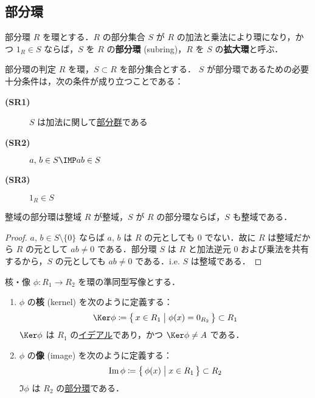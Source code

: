 \documentclass[geometry_main]{subfiles}
\begin{document}
\subsection{部分環}

\begin{mydef}[label=def:subring]{部分環}
	$R$ を環とする．$R$ の部分集合 $S$ が $R$ の加法と乗法により環になり，かつ $1_R\in S$ ならば，$S$ を $R$ の\textbf{部分環} (subring)，$R$ を $S$ の\textbf{拡大環}と呼ぶ．
\end{mydef}

\begin{myprop}[label=prop:subring]{部分環の判定}
	$R$ を環，$S \subset R$ を部分集合とする．
	$S$ が部分環であるための必要十分条件は，次の条件が成り立つことである：
	\begin{description}
		\item[\textbf{(SR1)}] $S$ は加法に関して\hyperref[def.subgroup]{部分群}である
		\item[\textbf{(SR2)}] $a,\, b \in S \IMP ab \in S$
		\item[\textbf{(SR3)}] $1_R \in S$
	\end{description}
\end{myprop}

\begin{myprop}[]{整域の部分環は整域}
	$R$ が整域，$S$ が $R$ の部分環ならば，$S$ も整域である．
\end{myprop}
\begin{proof}
	$a,\, b \in S\setminus \{0\}$ ならば $a,\, b$ は $R$ の元としても $0$ でない．故に $R$ は整域だから $R$ の元として $ab \neq 0$ である．部分環 $S$ は $R$ と加法逆元 $0$ および乗法を共有するから，$S$ の元としても $ab \neq 0$ である．i.e. $S$ は整域である．
\end{proof}

\begin{mydef}[label=def:ker-ring]{核・像}
	$\phi \colon R_1 \to R_2$ を環の準同型写像とする．
	\begin{enumerate}
		\item $\phi$ の\textbf{核} (kernel) を次のように定義する：
		\begin{align}
			\Ker \phi \coloneqq \bigl\{\, x \in R_1 \bigm| \phi(x) = 0_{R_2} \,\bigr\} \subset R_1
		\end{align}
		$\Ker \phi$ は $R_1$ の\underline{\hyperref[def:ideal]{イデアル}}であり，かつ $\Ker \phi \neq A$ である．
		\item $\phi$ の\textbf{像} (image) を次のように定義する：
		\begin{align}
			\Im \phi \coloneqq \bigl\{\, \phi(x) \bigm| x \in R_1 \,\bigr\} \subset R_2
		\end{align}
		$\Im \phi$ は $R_2$ の\underline{\hyperref[def:subring]{部分環}}である．
	\end{enumerate}
\end{mydef}
\end{document}

